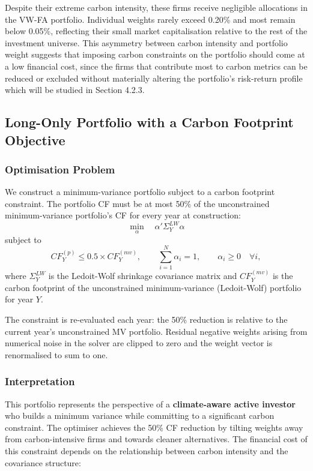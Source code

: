 \documentclass[11pt,a4paper]{article}
\begin{document}
Despite their extreme carbon intensity, these firms receive negligible allocations in the VW-FA portfolio. Individual weights rarely exceed 0.20\% and most remain below 0.05\%, reflecting their small market capitalisation relative to the rest of the investment universe. This asymmetry between carbon intensity and portfolio weight suggests that imposing carbon constraints on the portfolio should come at a low financial cost, since the firms that contribute most to carbon metrics can be reduced or excluded without materially altering the portfolio's risk-return profile which will be studied in Section 4.2.3.

\subsection{Long-Only Portfolio with a Carbon Footprint Objective}

\subsubsection{Optimisation Problem}

We construct a minimum-variance portfolio subject to a carbon footprint constraint. The portfolio CF must be at most 50\% of the unconstrained minimum-variance portfolio's CF for every year at construction:
\begin{equation}
\min_{\alpha} \quad \alpha' \Sigma_Y^{LW} \alpha
\end{equation}
subject to
\begin{equation}
CF_Y^{(p)} \leq 0.5 \times CF_Y^{(mv)}, \qquad \sum_{i=1}^{N} \alpha_i = 1, \qquad \alpha_i \geq 0 \quad \forall i,
\end{equation}
where \(\Sigma_Y^{LW}\) is the Ledoit-Wolf shrinkage covariance matrix and \(CF_Y^{(mv)}\) is the carbon footprint of the unconstrained minimum-variance (Ledoit-Wolf) portfolio for year \(Y\). 

The constraint is re-evaluated each year: the 50\% reduction is relative to the current year's unconstrained MV portfolio. Residual negative weights arising from numerical noise in the solver are clipped to zero and the weight vector is renormalised to sum to one.

\subsubsection{Interpretation}

This portfolio represents the perspective of a \textbf{climate-aware active investor} who builds a minimum variance while committing to a significant carbon constraint. The optimiser achieves the 50\% CF reduction by tilting weights away from carbon-intensive firms and towards cleaner alternatives. The financial cost of this constraint depends on the relationship between carbon intensity and the covariance structure:
\end{document}
